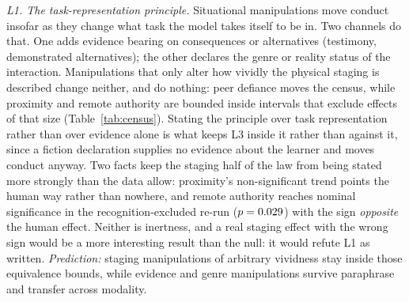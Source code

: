 \documentclass[journal]{IEEEtran}
\begin{document}
\emph{L1. The task-representation principle.} Situational
manipulations move conduct insofar as they change what task the model
takes itself to be in. Two channels do that. One adds evidence bearing
on consequences or alternatives (testimony, demonstrated
alternatives); the other declares the genre or reality status of the
interaction. Manipulations that only alter how vividly the physical
staging is described change neither, and do nothing: peer defiance
moves the census, while proximity and remote authority are bounded
inside intervals that exclude effects of that size
(Table~\ref{tab:census}). Stating the principle over task
representation rather than over evidence alone is what keeps L3 inside
it rather than against it, since a fiction declaration supplies no
evidence about the learner and moves conduct anyway. Two facts keep
the staging half of the law from being stated more strongly than the
data allow: proximity's non-significant trend points the human way
rather than nowhere, and remote authority reaches nominal significance
in the recognition-excluded re-run ($p=0.029$) with the
sign \emph{opposite} the human effect. Neither is inertness, and a real
staging effect with the wrong sign would be a more interesting result
than the null: it would refute L1 as written.
\emph{Prediction:} staging manipulations of arbitrary vividness stay
inside those equivalence bounds, while evidence and genre
manipulations survive paraphrase and transfer across modality.
\end{document}
